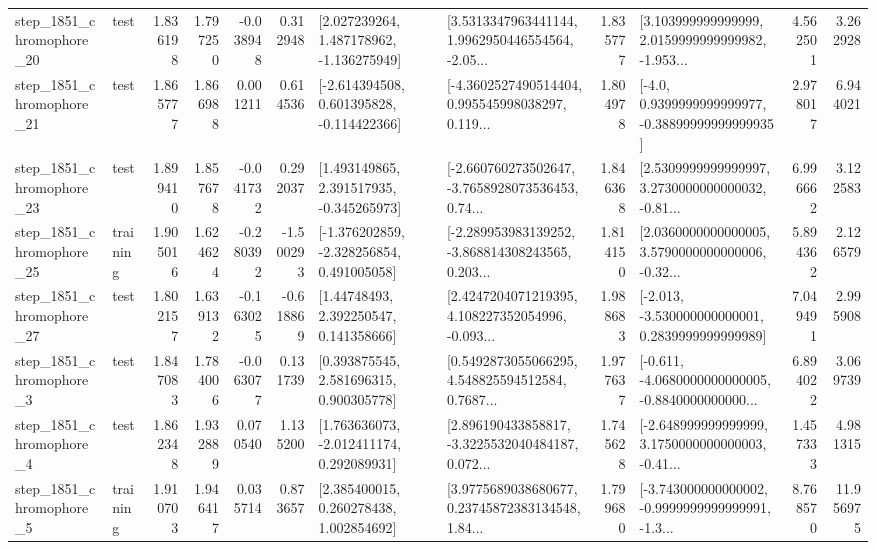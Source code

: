 \begin{tabular}{llrrrrllrlrr}
 step\_1851\_chromophore\_20 &      test &      1.836198 &    1.797250 &     -0.038948 &  0.312948 &    [2.027239264, 1.487178962, -1.136275949] &  [3.5313347963441144, 1.9962950446554564, -2.05... &       1.835777 &  [3.103999999999999, 2.0159999999999982, -1.953... &            4.562501 &          3.262928 \\
 step\_1851\_chromophore\_21 &      test &      1.865777 &    1.866988 &      0.001211 &  0.614536 &   [-2.614394508, 0.601395828, -0.114422366] &  [-4.3602527490514404, 0.995545998038297, 0.119... &       1.804978 &   [-4.0, 0.9399999999999977, -0.38899999999999935] &            2.978017 &          6.944021 \\
 step\_1851\_chromophore\_23 &      test &      1.899410 &    1.857678 &     -0.041732 &  0.292037 &    [1.493149865, 2.391517935, -0.345265973] &  [-2.660760273502647, -3.7658928073536453, 0.74... &       1.846368 &  [2.5309999999999997, 3.2730000000000032, -0.81... &            6.996662 &          3.122583 \\
 step\_1851\_chromophore\_25 &  training &      1.905016 &    1.624624 &     -0.280392 & -1.500293 &   [-1.376202859, -2.328256854, 0.491005058] &  [-2.289953983139252, -3.868814308243565, 0.203... &       1.814150 &  [2.0360000000000005, 3.5790000000000006, -0.32... &            5.894362 &          2.126579 \\
 step\_1851\_chromophore\_27 &      test &      1.802157 &    1.639132 &     -0.163025 & -0.618869 &      [1.44748493, 2.392250547, 0.141358666] &  [2.4247204071219395, 4.108227352054996, -0.093... &       1.988683 &   [-2.013, -3.530000000000001, 0.2839999999999989] &            7.049491 &          2.995908 \\
  step\_1851\_chromophore\_3 &      test &      1.847083 &    1.784006 &     -0.063077 &  0.131739 &     [0.393875545, 2.581696315, 0.900305778] &  [0.5492873055066295, 4.548825594512584, 0.7687... &       1.977637 &  [-0.611, -4.0680000000000005, -0.8840000000000... &            6.894022 &          3.069739 \\
  step\_1851\_chromophore\_4 &      test &      1.862348 &    1.932889 &      0.070540 &  1.135200 &    [1.763636073, -2.012411174, 0.292089931] &  [2.896190433858817, -3.3225532040484187, 0.072... &       1.745628 &  [-2.648999999999999, 3.1750000000000003, -0.41... &            1.457333 &          4.981315 \\
  step\_1851\_chromophore\_5 &  training &      1.910703 &    1.946417 &      0.035714 &  0.873657 &     [2.385400015, 0.260278438, 1.002854692] &  [3.9775689038680677, 0.23745872383134548, 1.84... &       1.799680 &  [-3.743000000000002, -0.9999999999999991, -1.3... &            8.768570 &         11.956975 \\

\end{tabular}
